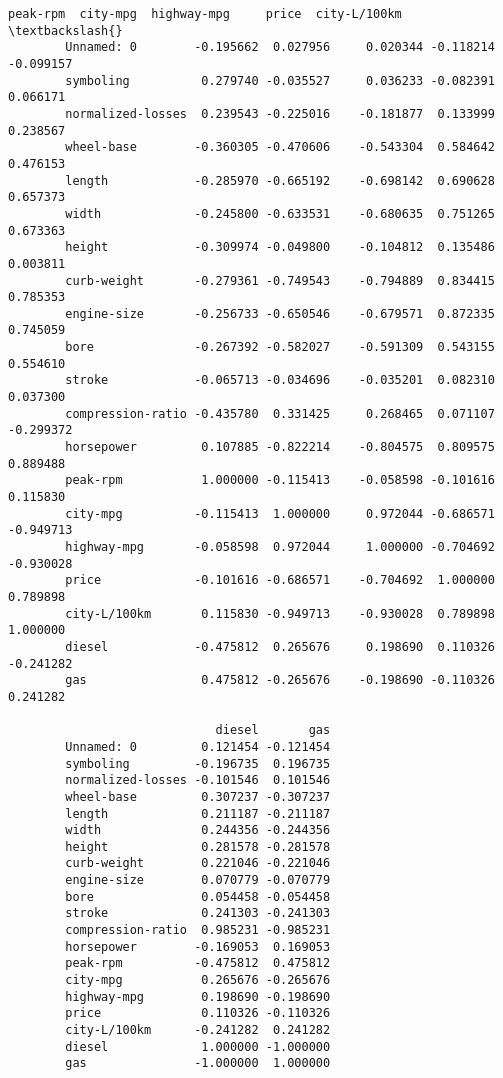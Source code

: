 \documentclass[11pt]{article}
\begin{document}
\begin{Verbatim}[commandchars=\\\{\}]
                           peak-rpm  city-mpg  highway-mpg     price  city-L/100km  \textbackslash{}
        Unnamed: 0        -0.195662  0.027956     0.020344 -0.118214     -0.099157   
        symboling          0.279740 -0.035527     0.036233 -0.082391      0.066171   
        normalized-losses  0.239543 -0.225016    -0.181877  0.133999      0.238567   
        wheel-base        -0.360305 -0.470606    -0.543304  0.584642      0.476153   
        length            -0.285970 -0.665192    -0.698142  0.690628      0.657373   
        width             -0.245800 -0.633531    -0.680635  0.751265      0.673363   
        height            -0.309974 -0.049800    -0.104812  0.135486      0.003811   
        curb-weight       -0.279361 -0.749543    -0.794889  0.834415      0.785353   
        engine-size       -0.256733 -0.650546    -0.679571  0.872335      0.745059   
        bore              -0.267392 -0.582027    -0.591309  0.543155      0.554610   
        stroke            -0.065713 -0.034696    -0.035201  0.082310      0.037300   
        compression-ratio -0.435780  0.331425     0.268465  0.071107     -0.299372   
        horsepower         0.107885 -0.822214    -0.804575  0.809575      0.889488   
        peak-rpm           1.000000 -0.115413    -0.058598 -0.101616      0.115830   
        city-mpg          -0.115413  1.000000     0.972044 -0.686571     -0.949713   
        highway-mpg       -0.058598  0.972044     1.000000 -0.704692     -0.930028   
        price             -0.101616 -0.686571    -0.704692  1.000000      0.789898   
        city-L/100km       0.115830 -0.949713    -0.930028  0.789898      1.000000   
        diesel            -0.475812  0.265676     0.198690  0.110326     -0.241282   
        gas                0.475812 -0.265676    -0.198690 -0.110326      0.241282   
        
                             diesel       gas  
        Unnamed: 0         0.121454 -0.121454  
        symboling         -0.196735  0.196735  
        normalized-losses -0.101546  0.101546  
        wheel-base         0.307237 -0.307237  
        length             0.211187 -0.211187  
        width              0.244356 -0.244356  
        height             0.281578 -0.281578  
        curb-weight        0.221046 -0.221046  
        engine-size        0.070779 -0.070779  
        bore               0.054458 -0.054458  
        stroke             0.241303 -0.241303  
        compression-ratio  0.985231 -0.985231  
        horsepower        -0.169053  0.169053  
        peak-rpm          -0.475812  0.475812  
        city-mpg           0.265676 -0.265676  
        highway-mpg        0.198690 -0.198690  
        price              0.110326 -0.110326  
        city-L/100km      -0.241282  0.241282  
        diesel             1.000000 -1.000000  
        gas               -1.000000  1.000000  
\end{Verbatim}
            
\end{document}
